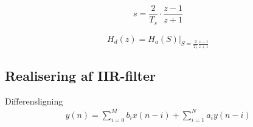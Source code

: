     \begin{align}
    s =  \dfrac{2}{T_s} \cdot \dfrac{z - 1}{z + 1}
    \end{align}

    \begin{equation}
    H_d(z) = H_a(S)\bigg|_{S = \frac{2}{T_s}\frac{z -1 }{z + 1}}
    \end{equation}



    \subsection{Realisering af IIR-filter}

    Differensligning
    \begin{align}
    y(n) = \sum\limits_{i=0}^{M} b_i x(n-i) + \sum\limits_{i=1}^N a_i y(n-i)
    \end{align}